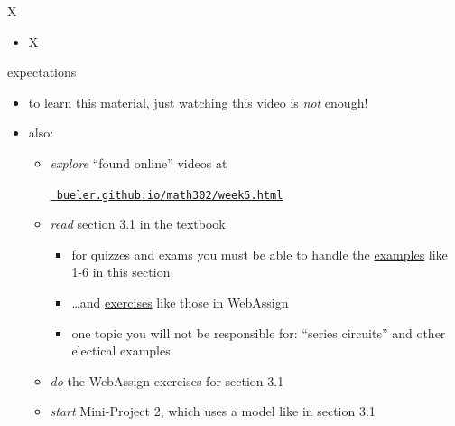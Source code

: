 \documentclass{beamer}
\begin{document}
\begin{frame}{X}

\begin{itemize}
\item X
\end{itemize}
\end{frame}


\begin{frame}{expectations}

\begin{itemize}
\item to learn this material, just watching this video is \emph{not} enough!

\item also:
     \begin{itemize}
     \item \emph{explore} ``found online'' videos at

     \centerline{\href{https://bueler.github.io/math302/week5.html}{\tt \color{cyan} bueler.github.io/math302/week5.html}}
     \item \emph{read} section 3.1 in the textbook
         \begin{itemize}
         \item for quizzes and exams you must be able to handle the \underline{examples} like 1-6 in this section
         \item \dots and \underline{exercises} like those in WebAssign
         \item one topic you will not be responsible for: ``series circuits'' and other electical examples
         \end{itemize}
     \item \emph{do} the WebAssign exercises for section 3.1
     \item \emph{start} Mini-Project 2, which uses a model like in section 3.1
     \end{itemize}
\end{itemize}
\end{frame}
\end{document}
